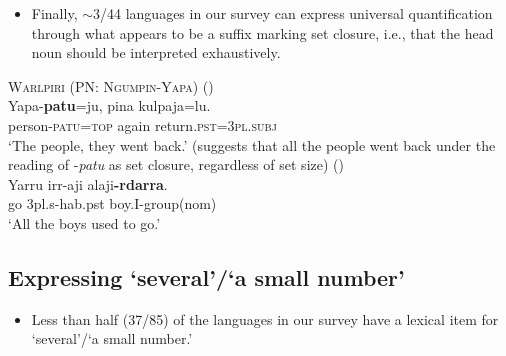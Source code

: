 \documentclass{article}
\makeatletter
\newcommand{\ofy}{/85} %
\makeatother
\begin{document}
\begin{itemize}
\item Finally, $\sim$3/44 languages in our survey can express universal quantification through what appears to be a suffix marking set closure, i.e., that the head noun should be interpreted exhaustively. 
\end{itemize}

\begin{exe}
  \ex \textsc{Warlpiri (PN: Ngumpin-Yapa)} (\citealt[13--14]{bowler17})\\
  \gll Yapa-\textbf{patu}=ju, pina kulpaja=lu.\\
  person-\textsc{patu}=\textsc{top} again return.\textsc{pst}=\textsc{3pl.subj}\\
  \glt `The people, they went back.' (suggests that all the people went back under the reading of -\textit{patu} as set closure, regardless of set size)
   (\citealt[80]{nordlinger98})\\
  \gll Yarru irr-aji  alaji\textbf{-rdarra}.\\
  go  3{\sc pl.s-hab.pst} boy.I-{\sc group(nom)}\\
  \glt `All the boys used to go.' 
\end{exe}


\subsection{Expressing `several'/`a small number'}

\begin{itemize}
\item Less than half (37\ofy) of the languages in our survey have a lexical item for `several'/`a small number.'
\end{itemize}
\end{document}
